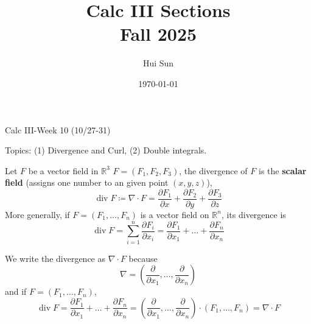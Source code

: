 \documentclass[openany]{book}
\title{Calc III Sections
\\ 
\vspace{0.4cm}
\large Fall 2025}
\date{\today}
\author{Hui Sun}
\newcommand{\R}{\mathbb{R}}
\newcommand{\diverg}{\operatorname{div}}
\begin{document}
\maketitle

\newpage


\begin{center}
    \Large Calc III-Week 10 (10/27-31)
\end{center}

\renewcommand\thesection{\arabic{section}}

\noindent
Topics: (1) Divergence and Curl, (2) Double integrals.




\begin{defn}[divergence]
    Let ${F}$ be a vector field in $\R^3$ $F=(F_1,F_2,F_3)$, the divergence of ${F}$ is the \textbf{scalar field} (assigns one number to an given point $(x, y, z)$), 
    \begin{equation*}
        \diverg F\coloneq\nabla\cdot F=\frac{\partial F_1}{\partial x}+\frac{\partial F_2}{\partial y}+\frac{\partial F_3}{\partial z}
    \end{equation*}
    More generally, if $F=(F_1,\dots, F_n)$ is a vector field on $\R^n$, its divergence is 
    \begin{equation*}
        \diverg F=\sum_{i=1}^n\frac{\partial F_i}{\partial x_i}=\frac{\partial F_1}{\partial x_1}+\dots+\frac{\partial F_n}{\partial x_n}
    \end{equation*}
\end{defn}

\begin{remark}
    We write the divergence as $\nabla\cdot F$ because 
    \begin{equation*}
        \nabla=\left(\frac{\partial}{\partial x_1}, \dots, \frac{\partial}{\partial x_n}\right)
    \end{equation*}
    and if $F=(F_1,\dots, F_n)$, 
    \begin{equation*}
        \diverg F=\frac{\partial F_1}{\partial x_1}+\dots+\frac{\partial F_n}{\partial x_n}=\left(\frac{\partial}{\partial x_1}, \dots, \frac{\partial}{\partial x_n}\right)\cdot(F_1,\dots, F_n)=\nabla\cdot F
    \end{equation*}
\end{remark}
\end{document}
